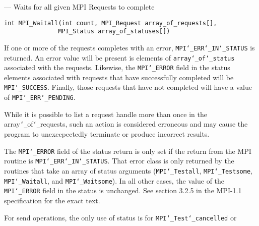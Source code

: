 \startmanpage
{}
--- Waits for all given MPI Requests to complete 
\startvb\begin{verbatim}
int MPI_Waitall(int count, MPI_Request array_of_requests[], 
               MPI_Status array_of_statuses[])

\end{verbatim}
\endvb

\par
{}
\par
{}
\par
If one or more of the requests completes with an error, {\tt MPI{\tt \char`\_}ERR{\tt \char`\_}IN{\tt \char`\_}STATUS} is
returned.  An error value will be present is elements of {\tt array{\tt \char`\_}of{\tt \char`\_}status
}associated with the requests.  Likewise, the {\tt MPI{\tt \char`\_}ERROR} field in the status
elements associated with requests that have successfully completed will be
{\tt MPI{\tt \char`\_}SUCCESS}.  Finally, those requests that have not completed will have a
value of {\tt MPI{\tt \char`\_}ERR{\tt \char`\_}PENDING}.
\par
While it is possible to list a request handle more than once in the
array{\tt \char`\_}of{\tt \char`\_}requests, such an action is considered erroneous and may cause the
program to unexecpectedly terminate or produce incorrect results.
\par
{}
\par
The {\tt MPI{\tt \char`\_}ERROR} field of the status return is only set if
the return from the MPI routine is {\tt MPI{\tt \char`\_}ERR{\tt \char`\_}IN{\tt \char`\_}STATUS}.  That error class
is only returned by the routines that take an array of status arguments
({\tt MPI{\tt \char`\_}Testall}, {\tt MPI{\tt \char`\_}Testsome}, {\tt MPI{\tt \char`\_}Waitall}, and {\tt MPI{\tt \char`\_}Waitsome}).  In
all other cases, the value of the {\tt MPI{\tt \char`\_}ERROR} field in the status is
unchanged.  See section 3.2.5 in the MPI-1.1 specification for the
exact text.
\par
For send operations, the only use of status is for {\tt MPI{\tt \char`\_}Test{\tt \char`\_}cancelled} or
